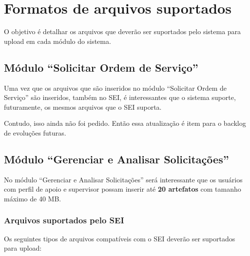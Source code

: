 \chapter{Formatos de arquivos suportados}
\label{detalhes:arquivos}

O objetivo é detalhar os arquivos que deverão ser suportados pelo sistema para upload em cada módulo do sistema.





\section{Módulo ``Solicitar Ordem de Serviço''}

Uma vez que os arquivos que são inseridos no módulo ``Solicitar Ordem de Serviço'' são inseridos, também no SEI, é interessantes que o sistema suporte, futuramente, os mesmos arquivos que o SEI suporta.

Contudo, isso ainda não foi pedido. Então essa atualização é item para o backlog de evoluções futuras.



\section{Módulo ``Gerenciar e Analisar Solicitações''}




No módulo ``Gerenciar e Analisar Solicitações'' será interessante que os usuários com perfil de apoio e supervisor possam inserir até \textbf{20 artefatos} com tamanho máximo de 40 MB. 

\pagebreak

\subsection{Arquivos suportados pelo SEI}

Os seguintes tipos de arquivos compatíveis com o SEI deverão ser suportados para upload:

